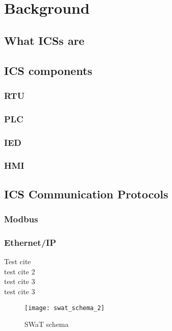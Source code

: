 \chapter{Background}
\label{background}

\section{What ICSs are}

\section{ICS components}
\label{sec:ics_components}
\subsection{RTU}
\subsection{PLC}
\subsection{IED}
\subsection{HMI}

\section{ICS Communication Protocols}
\label{sec:ics_protocols}
\subsection{Modbus}
\subsection{Ethernet/IP}

Test cite \cite{ceccato} \\
test cite 2 \cite{itrust_swat} \\
test cite 3 \cite{itrust_site} \\
test cite 3 \cite{itrust_invariants_paper}\\

\begin{figure}[h]
	\texttt{[image: swat\_schema\_2]}
	\caption{SWaT schema}
	\label{fig:Schema SWaT}
\end{figure}

